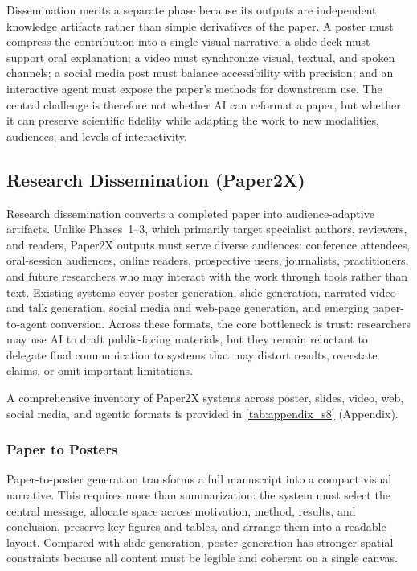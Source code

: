 \documentclass{llmxive}
\begin{document}
Dissemination merits a separate phase because its outputs are independent knowledge artifacts rather than simple derivatives of the paper. A poster must compress the contribution into a single visual narrative; a slide deck must support oral explanation; a video must synchronize visual, textual, and spoken channels; a social media post must balance accessibility with precision; and an interactive agent must expose the paper's methods for downstream use. The central challenge is therefore not whether AI can reformat a paper, but whether it can preserve scientific fidelity while adapting the work to new modalities, audiences, and levels of interactivity.



\subsection{Research Dissemination (Paper2X)}
\label{sec:paper2x}

Research dissemination converts a completed paper into audience-adaptive artifacts. Unlike Phases~1--3, which primarily target specialist authors, reviewers, and readers, Paper2X outputs must serve diverse audiences: conference attendees, oral-session audiences, online readers, prospective users, journalists, practitioners, and future researchers who may interact with the work through tools rather than text. Existing systems cover poster generation, slide generation, narrated video and talk generation, social media and web-page generation, and emerging paper-to-agent conversion. Across these formats, the core bottleneck is trust: researchers may use AI to draft public-facing materials, but they remain reluctant to delegate final communication to systems that may distort results, overstate claims, or omit important limitations.

A comprehensive inventory of Paper2X systems across poster, slides, video, web, social media, and agentic formats is provided in \cref{tab:appendix_s8} (Appendix).



\subsubsection{Paper to Posters}
\label{sec:paper2poster}

Paper-to-poster generation transforms a full manuscript into a compact visual narrative. This requires more than summarization: the system must select the central message, allocate space across motivation, method, results, and conclusion, preserve key figures and tables, and arrange them into a readable layout. Compared with slide generation, poster generation has stronger spatial constraints because all content must be legible and coherent on a single canvas.
\end{document}
